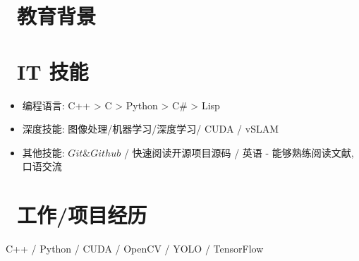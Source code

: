 \documentclass{resume}
\begin{document}


\section{\faGraduationCap\  教育背景}

\section{\faCogs\ IT 技能}
\begin{itemize}[parsep=0.5ex]
  \item 编程语言: C++ > C > Python > C\# > Lisp
  \item 深度技能: 图像处理/机器学习/深度学习/ CUDA / vSLAM
  \item 其他技能: $Git\& Github$ / 快速阅读开源项目源码 / 英语 - 能够熟练阅读文献,口语交流
\end{itemize}

\section{\faUsers\ 工作/项目经历}

C++ / Python / CUDA / OpenCV / YOLO / TensorFlow
\end{document}
